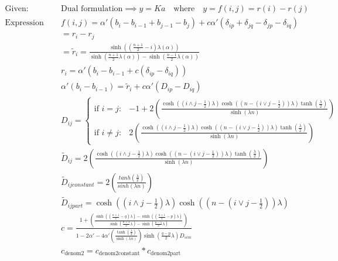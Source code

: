 \documentclass[a4paper, 12pt]{article}
\begin{document}
\begin{align*} 
\text{Given:} \quad & \text{Dual formulation} \implies y = Ka \quad \text{where} \quad y = f(i, j) = r(i) - r(j)\\
\text{Expression Definitions:}
\quad & f(i,j) = \alpha' (b_i - b_{i-1} + b_{j-1} - b_j) + c\alpha'(\delta_{ip} + \delta_{jq} - \delta_{jp} - \delta_{iq}) \\ & = r_i - r_j\\
& = \tilde{r}_i = \frac{\sinh\left(\left(\frac{n+1}{2} - i\right)\lambda(\alpha)\right)}{\sinh\left(\frac{n+1}{2}\lambda(\alpha)\right) - \sinh\left(\frac{n-1}{2}\lambda(\alpha)\right)}\\
& r_i = \alpha' (b_i - b_{i-1} + c(\delta_{ip} - \delta_{iq}))\\
&  \alpha' (b_i - b_{i-1}) =  \tilde{r}_i + c \alpha' (D_{ip} - D_{iq})\\ 
& D_{ij} = 
\begin{cases} 
\text{if } i=j: & -1 + 2 \left(\frac{\cosh\left((i\land j - \frac{1}{2})\lambda\right)\cosh\left(\left(n-(i\lor j - \frac{1}{2})\right)\lambda\right)\tanh\left(\frac{\lambda}{2}\right)}{\sinh(\lambda n)}\right) \\
\text{if } i \neq j: & 2 \left(\frac{\cosh\left((i\land j - \frac{1}{2})\lambda\right)\cosh\left(\left(n-(i\lor j - \frac{1}{2})\right)\lambda\right)\tanh\left(\frac{\lambda}{2}\right)}{\sinh(\lambda n)}\right)
\end{cases} \\
& \tilde{D}_{ij} = 2 \left(\frac{\cosh\left((i\land j - \frac{1}{2})\lambda\right)\cosh\left(\left(n-(i\lor j - \frac{1}{2})\right)\lambda\right)\tanh\left(\frac{\lambda}{2}\right)}{\sinh(\lambda n)} \right) \\
& \tilde{D}_{ij constant} = 2 \left(\frac{tanh(\frac{\lambda}{2})}{sinh(\lambda n)}\right) \\
& \tilde{D}_{ijpart} = \cosh\left((i\land j - \frac{1} {2})\lambda\right)\cosh\left(\left(n-(i\lor j - \frac{1}{2})\right)\lambda\right)
& \\
& c = \frac{
1 + \left( \frac{\sinh\left(\left(\frac{n + 1}{2} - q\right) \lambda \right) - \sinh\left(\left(\frac{n + 1}{2} - p\right) \lambda \right)}{\sinh\left(\frac{n + 1}{2} \lambda \right) - \sinh\left(\frac{n - 1}{2} \lambda \right)} \right)
}{1 - 2\alpha' - 4\alpha' \left( \frac{\tanh\left(\frac{\lambda}{2}\right)}{\sinh(\lambda n)} \right) \sinh\left(\frac{q-p}{2} \lambda\right) D_{sim} }  \\
& c_{\text{denom2}} = c_{\text{denom2constant}} * c_{\text{denom2part}} \\

\end{align*}
\end{document}
